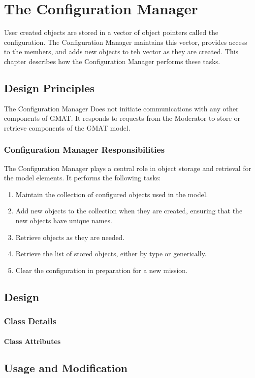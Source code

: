 \chapter{\label{chapter:ConfigurationManager}The Configuration Manager}

User created objects are stored in a vector of object pointers called the configuration. The
Configuration Manager maintains this vector, provides access to the members, and adds new objects
to teh vector as they are created.  This chapter describes how the Configuration Manager performs
these tasks.

\section{Design Principles}

The Configuration Manager Does not initiate communications with any other components of GMAT.  It
responds to requests from the Moderator to store or retrieve components of the GMAT model.

\subsection{Configuration Manager Responsibilities}

The Configuration Manager plays a central role in object storage and retrieval for the model
elements.  It performs the following tasks:

\begin{enumerate}
\item Maintain the collection of configured objects used in the model.
\item Add new objects to the collection when they are created, ensuring that the new objects have
unique names.
\item Retrieve objects as they are needed.
\item Retrieve the list of stored objects, either by type or generically.
\item Clear the configuration in preparation for a new mission.
\end{enumerate}

\section{Design}

\subsection{Class Details}

\subsubsection{Class Attributes}

\section{Usage and Modification}

